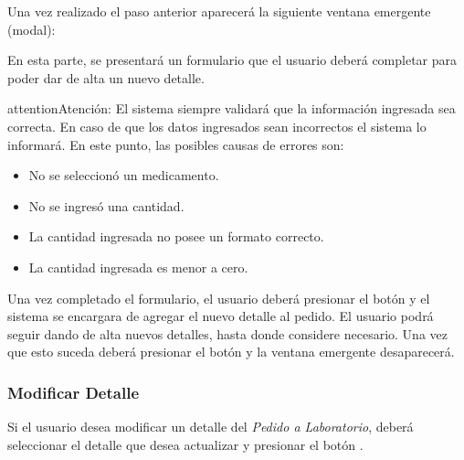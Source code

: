 \documentclass[a4paper,10pt,spanish]{sphinxmanual}
\begin{document}

Una vez realizado el paso anterior aparecerá la siguiente ventana emergente (modal):


En esta parte, se presentará un formulario que el usuario deberá completar para poder dar de alta un nuevo detalle.

\begin{notice}{attention}{Atención:}
El sistema siempre validará que la información ingresada sea correcta. En caso de que los datos ingresados sean incorrectos el sistema lo informará.
En este punto, las posibles causas de errores son:
\begin{itemize}
\item {} 
No se seleccionó un medicamento.

\item {} 
No se ingresó una cantidad.

\item {} 
La cantidad ingresada no posee un formato correcto.

\item {} 
La cantidad ingresada es menor a cero.

\end{itemize}
\end{notice}

Una vez completado el formulario, el usuario deberá presionar el botón  y el sistema se encargara de agregar el nuevo detalle al pedido.
El usuario podrá seguir dando de alta nuevos detalles, hasta donde considere necesario. Una vez que esto suceda deberá presionar el botón  y la ventana emergente desaparecerá.


\subsubsection{Modificar Detalle}
\label{pedidosalab:modificar-detalle}\label{pedidosalab:modificar-detalle-pl}
Si el usuario desea modificar un detalle del \emph{Pedido a Laboratorio}, deberá seleccionar el detalle que desea actualizar y presionar el botón .

\end{document}

